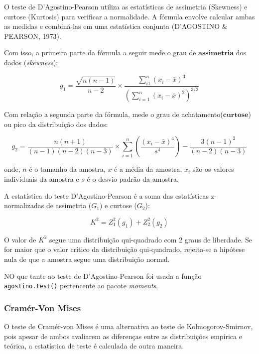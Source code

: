 \documentclass[a4paper,11pt]{article} %
\begin{document}
O teste de D'Agostino-Pearson utiliza as estatísticas de assimetria (Skewness) e curtose (Kurtosis) para verificar a normalidade. A fórmula envolve calcular ambas as medidas e combiná-las em uma estatística conjunta (D'AGOSTINO \& PEARSON, 1973).\vskip0.3cm

Com isso, a primeira parte da fórmula a seguir mede o grau de $\textbf{assimetria}$ dos dados (\textit{skewness}):

\begin{equation}
g_{1} = \frac{\sqrt{n(n-1)}}{n-2} \times \frac{\sum_{i1}^{n} (x_{i}-\bar{x})^{3}}{\left( \sum_{i=1}^{n} (x_{i}-\bar{x})^{2}\right)^{3/2}}
\end{equation}

Com relação a segunda parte da fórmula, mede o grau de achatamento($\textbf{curtose}$) ou pico da distribuição dos dados:

\begin{equation}
g_{2} = \frac{n(n+1)}{(n-1)(n-2)(n-3)} \times \sum_{i=1}^{n} \left(  \frac{(x_{i}-\bar{x})^{4}}{s^{4}} \right) - \frac{3(n-1)^{2}}{(n-2)(n-3)}
\end{equation}

onde, $n$ é o tamanho da amostra, $\bar{x}$ é a média da amostra, $x_{i}$ são os valores individuais da amostra e $s$ é o desvio padrão da amostra.\vskip0.3cm

A estatística do teste  D'Agostino-Pearson é a soma das estatísticas z-normalizadas de assimetria ($G_{1}$) e curtose ($G_{2}$):\vskip0.3cm

\begin{equation}
    K^{2} = Z_{1}^{2}(g_{1}) + Z_{2}^{2}(g_{2})
\end{equation}

O valor de $K^{2}$ segue uma distribuição qui-quadrado com 2 graus de liberdade. Se for maior que o valor crítico da distribuição qui-quadrado, rejeita-se a hipótese nula de que a amostra segue uma distribuição normal.\vskip0.3cm

NO que tante ao teste de D’Agostino-Pearson foi usada a função \texttt{agostino.test()} pertencente ao pacote \textit{moments}.\vskip0.3cm


\subsubsection{Cramér-Von Mises}

O teste de Cramér-von Mises é uma alternativa ao teste de Kolmogorov-Smirnov, pois
apesar de ambos avaliarem as diferenças entre as distribuições empírica e teórica, a estatística de teste é calculada de outra maneira.\vskip0.3cm
\end{document}
